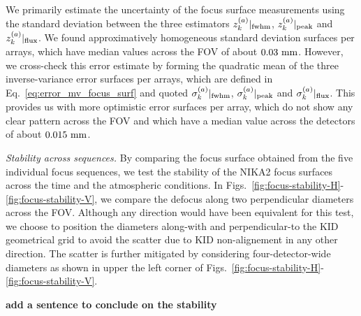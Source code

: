We primarily estimate the uncertainty of the focus
surface measurements using the standard deviation between the three
estimators $z_k^{(a)}|_{\rm{fwhm}}$, $z_k^{(a)}|_{\rm{peak}}$ and
$z_k^{(a)}|_{\rm{flux}}$. We found approximatively homogeneous
standard deviation surfaces per arrays, which have median values across
the FOV of about $0.03~\rm{mm}$.
However, we cross-check this error estimate by forming the quadratic mean of
the three inverse-variance error surfaces per arrays, which are defined in
Eq.~\ref{eq:error_mv_focus_surf} and quoted
$\sigma_k^{(a)}|_{\rm{fwhm}}$, $\sigma_k^{(a)}|_{\rm{peak}}$ and
$\sigma_k^{(a)}|_{\rm{flux}}$. This provides us with more optimistic
error surfaces per array, which do not show any clear pattern across
the FOV and which have a median value across the detectors of about
$0.015~\rm{mm}$.  


\emph{Stability across sequences. }
By comparing the focus surface obtained from the five individual focus
sequences, we test the stability of the NIKA2 focus surfaces across
the time and the atmospheric conditions. In
Figs.~\ref{fig:focus-stability-H}-\ref{fig:focus-stability-V}, we compare
the defocus along two perpendicular diameters across the
FOV. Although any direction would have been equivalent for this test, we choose to
position the diameters along-with and perpendicular-to the KID geometrical
grid to avoid the scatter due to KID non-alignement in any other
direction. The scatter is further mitigated by considering
four-detector-wide diameters as shown in upper the left corner of
Figs.~\ref{fig:focus-stability-H}-\ref{fig:focus-stability-V}.

{\bf add a sentence to conclude on the stability}


